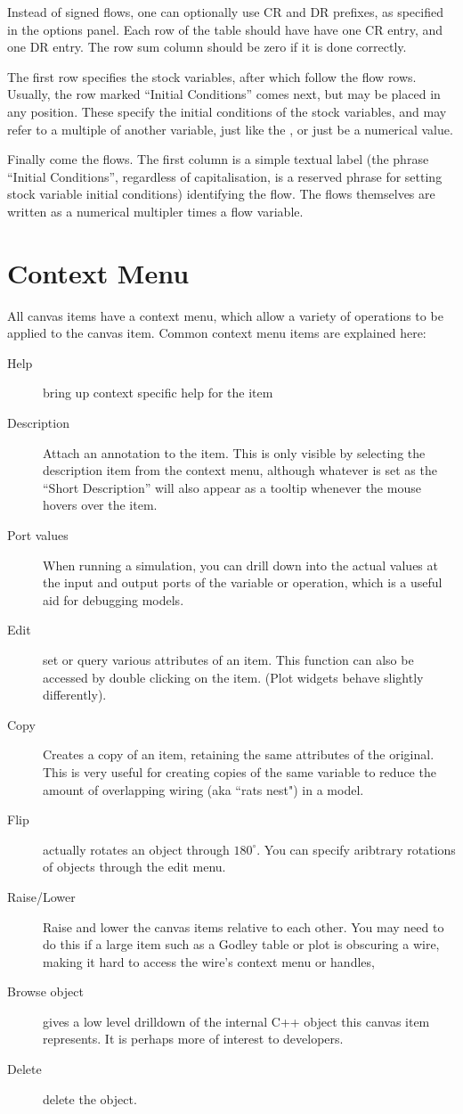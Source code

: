 Instead of signed flows, one can optionally use CR and DR prefixes, as
specified in the options panel. Each row of the table should have have
one CR entry, and one DR entry. The row sum column should be zero if
it is done correctly.

The first row specifies the stock variables, after which follow the
flow rows. Usually, the row marked ``Initial Conditions'' comes next,
but may be placed in any position. These specify the initial
conditions of the stock variables, and may refer to a multiple of
another variable, just like the , or just be a numerical value.

Finally come the flows. The first column is a simple textual label
(the phrase ``Initial Conditions'', regardless of capitalisation, is a
reserved phrase for setting stock variable initial conditions)
identifying the flow. The flows themselves are written as a numerical
multipler times a flow variable. 

\section{Context Menu}

All canvas items have a context menu, which allow a variety of
operations to be applied to the canvas item. Common context menu items
are explained here:
\begin{description}
\item[Help] bring up context specific help for the item
\item[Description] Attach an annotation to the item. This is only
visible by selecting the description item from the context menu,
although whatever is set as the ``Short Description'' will also appear
as a tooltip whenever the mouse hovers over the item.
\item[Port values] When running a simulation, you can drill down into
the actual values at the input and output ports of the variable or
operation, which is a useful aid for debugging models.
\item[Edit] set or query various attributes of an item. This function
can also be accessed by double clicking on the item. (Plot widgets
behave slightly differently).
\item[Copy] Creates a copy of an item, retaining the same attributes
of the original. This is very useful for creating copies of the same
variable to reduce the amount of overlapping wiring (aka ``rats nest")
in a model.
\item[Flip] actually rotates an object through $180^\circ$. You can
specify aribtrary rotations of objects through the edit menu.
\item[Raise/Lower] Raise and lower the canvas items relative to each
other. You may need to do this if a large item such as a Godley table
or plot is obscuring a wire, making it hard to access the wire's
context menu or handles,
\item[Browse object] gives a low level drilldown of the internal C++
object this canvas item represents. It is perhaps more of interest to
developers. 
\item[Delete] delete the object.
\end{description}

